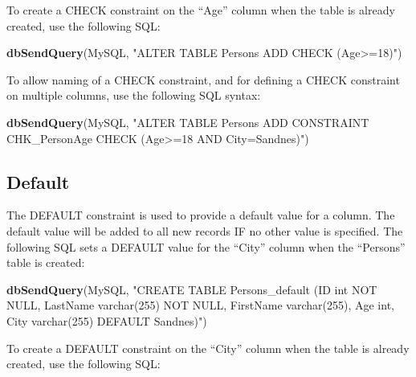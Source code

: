 \documentclass[
]{book}
\newenvironment{Shaded}{\begin{snugshade}}{\end{snugshade}}
\newcommand{\FunctionTok}[1]{\textcolor[rgb]{0.13,0.29,0.53}{\textbf{#1}}}
\newcommand{\NormalTok}[1]{#1}
\newcommand{\StringTok}[1]{\textcolor[rgb]{0.31,0.60,0.02}{#1}}
\begin{document}
To create a CHECK constraint on the ``Age'' column when the table is already created, use the following SQL:

\begin{Shaded}
\begin{Highlighting}[]
\FunctionTok{dbSendQuery}\NormalTok{(MySQL, }\StringTok{"ALTER TABLE Persons}
\StringTok{                         ADD CHECK (Age\textgreater{}=18)"}\NormalTok{)}
\end{Highlighting}
\end{Shaded}

To allow naming of a CHECK constraint, and for defining a CHECK constraint on multiple columns, use the following SQL syntax:

\begin{Shaded}
\begin{Highlighting}[]
\FunctionTok{dbSendQuery}\NormalTok{(MySQL, }\StringTok{"ALTER TABLE Persons}
\StringTok{                    ADD CONSTRAINT CHK\_PersonAge }
\StringTok{                    CHECK (Age\textgreater{}=18 AND City=\textquotesingle{}Sandnes\textquotesingle{})"}\NormalTok{)}
\end{Highlighting}
\end{Shaded}

\hypertarget{default}{%
\subsection{Default}\label{default}}

The DEFAULT constraint is used to provide a default value for a column. The default value will be added to all new records IF no other value is specified. The following SQL sets a DEFAULT value for the ``City'' column when the ``Persons'' table is created:

\begin{Shaded}
\begin{Highlighting}[]
\FunctionTok{dbSendQuery}\NormalTok{(MySQL,}
\StringTok{"CREATE TABLE Persons\_default (ID int NOT NULL,}
\StringTok{                              LastName varchar(255) NOT NULL,}
\StringTok{                              FirstName varchar(255),}
\StringTok{                              Age int,}
\StringTok{                              City varchar(255) DEFAULT \textquotesingle{}Sandnes\textquotesingle{})"}\NormalTok{)}
\end{Highlighting}
\end{Shaded}

To create a DEFAULT constraint on the ``City'' column when the table is already created, use the following SQL:
\end{document}
